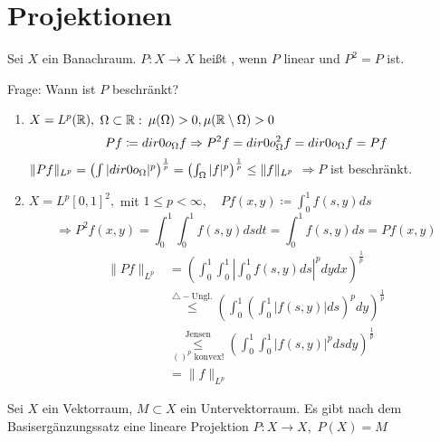 
\section{Projektionen}



\begin{definition} \label{def:11.1-Projektion}
	Sei $X$ ein Banachraum. $P \colon X \rightarrow X$ hei{\ss}t , wenn $P$ linear und $P^{2} = P$ ist.
\end{definition}

Frage: Wann ist $P$ beschränkt?


\begin{beispiel}
	\begin{enumerate}[label=\alph*\upshape)]
		\item $X = L^{p}(\mathbb{R}), $ $\Omega \subset \mathbb{R}: $ $\mu(\Omega) > 0, \mu(\mathbb{R} \setminus \Omega) > 0$
			\[ P f \coloneqq \1_{\Omega} f \Rightarrow P^{2} f = \1_{\Omega}^{2} f = \1_{\Omega} f = P f \]
			$\| P f \|_{L^{p}} = \left( \int | \1_{\Omega} |^{p} \right)^{\frac{1}{p}} = \left( \int_{\Omega} | f |^{p} \right)^{\frac{1}{p}} \leq \| f \|_{L^{p}}$ $\Rightarrow P$ ist beschränkt.
		\item $X = L^{p}[0, 1]^{2},$ mit $1 \leq p < \infty, \quad P f(x, y) \coloneqq \int_{0}^{1} f(s, y) ds$
			\[ \Rightarrow P^{2} f (x, y) = \int_{0}^{1} \int_{0}^{1} f(s, y) ds dt = \int_{0}^{1} f(s, y) ds = P f(x, y) \]
			\begin{align*}
				\| P f \|_{L^{p}} & = \left( \int_{0}^{1} \int_{0}^{1} \left| \int_{0}^{1} f(s, y) ds \right|^{p} dy dx \right)^{\frac{1}{p}} \\
				& \overset{\triangle-\text{Ungl.}}{\leq} \left( \int_{0}^{1} \left( \int_{0}^{1} |f(s, y)| ds \right)^{p} dy \right)^{\frac{1}{p}} \\
				& \underset{()^{p} \text{ konvex!}}{\overset{\text{Jensen}}{\leq}}\left( \int_{0}^{1} \int_{0}^{1} |f(s, y)|^{p} ds dy \right)^{\frac{1}{p}} \\
				& = \| f \|_{L^{p}}
			\end{align*}
	\end{enumerate}
\end{beispiel}


\begin{bemerkung}
	Sei $X$ ein Vektorraum, $M \subset X$ ein Untervektorraum. Es gibt nach dem Basisergänzungssatz eine lineare Projektion $P \colon X \rightarrow X,$ $P(X) = M$	
\end{bemerkung}

